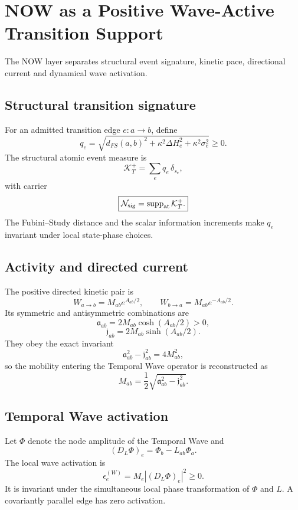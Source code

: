 
\chapter{NOW as a Positive Wave-Active Transition Support}

The NOW layer separates structural event signature, kinetic pace, directional current and dynamical wave activation.

\section{Structural transition signature}

For an admitted transition edge $e:a\to b$, define
\[
\boxed{
q_e=
\sqrt{
 d_{FS}(a,b)^2
 +\kappa^2\Delta H_e^2
 +\kappa^2\sigma_e^2
}\ge0.
}
\]
The structural atomic event measure is
\[
\mathcal K_T^+
=\sum_e q_e\,\delta_{s_e},
\]
with carrier
\[
\boxed{
\mathcal N_{\rm sig}
=\operatorname{supp}_{\rm at}\mathcal K_T^+.
}
\]
The Fubini--Study distance and the scalar information increments make $q_e$ invariant under local state-phase choices.

\section{Activity and directed current}

The positive directed kinetic pair is
\[
W_{a\to b}=M_{ab}e^{A_{ab}/2},
\qquad
W_{b\to a}=M_{ab}e^{-A_{ab}/2}.
\]
Its symmetric and antisymmetric combinations are
\[
\boxed{
\mathfrak a_{ab}=2M_{ab}\cosh(A_{ab}/2)>0,
}
\]
\[
\boxed{
\mathfrak j_{ab}=2M_{ab}\sinh(A_{ab}/2).
}
\]
They obey the exact invariant
\[
\boxed{
\mathfrak a_{ab}^2-\mathfrak j_{ab}^2=4M_{ab}^2,
}
\]
so the mobility entering the Temporal Wave operator is reconstructed as
\[
\boxed{
M_{ab}
=\frac12\sqrt{\mathfrak a_{ab}^2-\mathfrak j_{ab}^2}.
}
\]

\section{Temporal Wave activation}

Let $\Phi$ denote the node amplitude of the Temporal Wave and
\[
(D_L\Phi)_e=\Phi_b-L_{ab}\Phi_a.
\]
The local wave activation is
\[
\boxed{
\epsilon_e^{(W)}
=M_e|(D_L\Phi)_e|^2\ge0.
}
\]
It is invariant under the simultaneous local phase transformation of $\Phi$ and $L$.  A covariantly parallel edge has zero activation.

